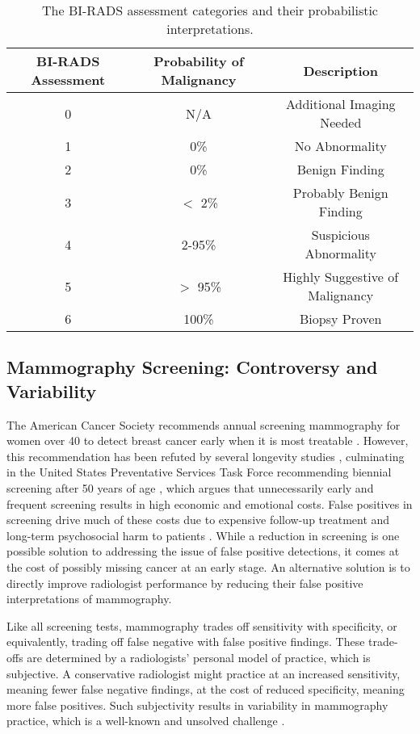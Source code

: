 \begin{table}[ht!]
\centering
\begin{tabular}{|c|c|c|}
	\hline  BI-RADS Assessment&  Probability of Malignancy & Description \\ 
	\hline\hline
	0& N/A & Additional Imaging Needed \\ 
	\hline
	1& 0\% & No Abnormality \\ 
	\hline  
	2& 0\% & Benign Finding  \\ 
	\hline  
	3& $<$ 2\% & Probably Benign Finding \\ 
	\hline  
	4& 2-95\% & Suspicious Abnormality \\ 
	\hline  
	5& $>$ 95\% & Highly Suggestive of Malignancy \\ 
	\hline  
	6& 100\% & Biopsy Proven \\ 
	\hline 
\end{tabular}
\caption{The BI-RADS assessment categories and their probabilistic interpretations.}
\label{table:birads}
\end{table}

\subsection{Mammography Screening: Controversy and Variability}
The American Cancer Society recommends annual screening mammography for women over 40 to detect breast cancer early when it is most treatable \cite{Nystrom:2002hb, Smith:2003en, Smart:1997hk}. However, this recommendation has been refuted by several longevity studies \cite{Bleyer:2012dc, Kalager:2012ez},  culminating in the United States Preventative Services Task Force recommending biennial screening after 50 years of age \cite{Kerlikowske:2013ej, Anonymous:2009fl}, which argues that unnecessarily early and frequent screening results in high economic and emotional costs.  False positives in screening drive much of these costs due to expensive follow-up treatment and long-term psychosocial harm to patients \cite{Kerlikowske:2013ej, Brodersen:2013kq}. While a reduction in screening is one possible solution to addressing the issue of false positive detections, it comes at the cost of possibly missing cancer at an early stage. An alternative solution is to directly improve radiologist performance by reducing their false positive interpretations of mammography. 

Like all screening tests, mammography trades off sensitivity with specificity, or equivalently, trading off false negative with false positive findings. These trade-offs are determined by a radiologists' personal model of practice, which is subjective. A conservative radiologist might practice at an increased sensitivity, meaning fewer false negative findings, at the cost of reduced specificity, meaning more false positives. Such subjectivity results in variability in mammography practice, which is a well-known and unsolved challenge \cite{Elmore:2009vu, Elmore:2012er, Beam:1996ui, Taplin:2008bv}. 

